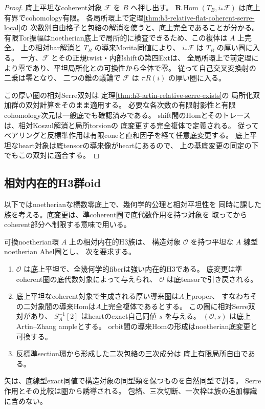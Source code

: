 \begin{proof}
底上平坦なcoherent対象 $\mathcal F$ を $B$ へ押し出す。
$\mathbf R\operatorname{Hom}(T_B,i_*\mathcal F)$ は底上有界でcohomology有限。
各局所環上で定理\ref{thm:h3-relative-flat-coherent-serre-local}の
次数別自由格子と包絡の解消を使うと、底上完全であることが分かる。
有限Tor振幅はnoetherian底上で局所的に検査できるため、この複体は $A$ 上完全。
上の相対bar解消と $T_B$ の導来Morita同値により、
$i_*\mathcal F$ は $T_B$ の厚い圏に入る。
一方、$\mathcal F$ とその正規twist・内部shiftの第四Extは、
全局所環上で前定理により零であり、平坦局所化との可換性から全体で零。
従って自己交叉変換射の二乗は零となり、
二つの錐の議論で $\mathcal F$ は $\pi R(i)$ の厚い圏に入る。

この厚い圏の相対Serre双対は
定理\ref{thm:h3-artin-relative-serre-exists}の
局所化双加群の双対計算をそのまま適用する。
必要な各次数の有限射影性と有限cohomology次元は一般底でも確認済みである。
shift間のHomとそのトレースは、相対Koszul解消と局所torsionの
底変更する完全複体で定義される。
従ってペアリングと反標準作用は有限coneと直和因子を経て任意底変更する。
底上平坦なheart対象は底tensorの導来像がheartにあるので、
上の基底変更の同定の下でもこの双対に適合する。
\end{proof}

\subsection{相対内在的H3群oid}
以下ではnoetherianな標数零底上で、幾何学的公理と相対平坦性を
同時に課した族を考える。底変更は、準coherent圏で底代数作用を持つ対象を
取ってからcoherent部分へ制限する意味で用いる。

\begin{definition}\label{def:h3-intrinsic-family}
可換noetherian環 $A$ 上の相対内在的H3族は、
構造対象 $\mathcal O$ を持つ平坦な $A$ 線型noetherian Abel圏とし、
次を要求する。
\begin{enumerate}
\item $\mathcal O$ は底上平坦で、全幾何学的fiberは強い内在的H3である。
底変更は準coherent圏の底代数対象によって与えられ、
$\mathcal O$ は底tensorで引き戻される。
\item 底上平坦なcoherent対象で生成される厚い導来圏は$A$上proper、
すなわちその二対象間の導来Homは$A$上完全複体であるとする。
この圏に相対Serre双対があり、
$S_A^{-1}[2]$ はheartのexact自己同値 $s$ を与える。
$(\mathcal O,s)$ は底上Artin--Zhang ampleとする。
orbit間の導来Homの形成はnoetherian底変更と可換する。
\item 反標準section環から形成した二次包絡の三次成分は
底上有限局所自由である。
\end{enumerate}
矢は、底線型exact同値で構造対象の同型類を保つものを自然同型で割る。
Serre作用とその比較は圏から誘導される。
包絡、三次切断、一次枠は族の追加標識に含めない。
\end{definition}


